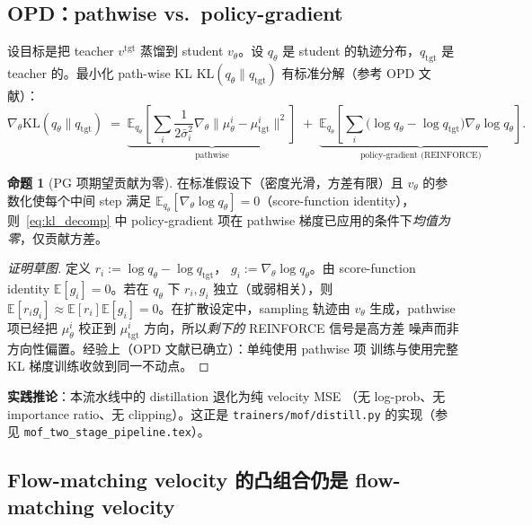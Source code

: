 \documentclass[11pt,a4paper]{article}
\newcommand{\E}{\mathbb{E}}
\newcommand{\KL}{\mathrm{KL}}
\theoremstyle{definition}
\newtheorem{proposition}{命题}
\begin{document}
\subsection{OPD：pathwise vs.\ policy-gradient}
\label{ssec:opd_decomp}

设目标是把 teacher $v^{\mathrm{tgt}}$ 蒸馏到 student $v_\theta$。设
$q_\theta$ 是 student 的轨迹分布，$q_{\mathrm{tgt}}$ 是 teacher 的。最小化
path-wise KL $\KL(q_\theta \| q_{\mathrm{tgt}})$ 有标准分解（参考 OPD
文献）：
\begin{equation}
\nabla_\theta \KL(q_\theta\|q_{\mathrm{tgt}})
\;=\;
\underbrace{\E_{q_\theta}\!\left[\sum_i\frac{1}{2\bar\sigma_i^2}\nabla_\theta\| \mu_\theta^i - \mu_{\mathrm{tgt}}^i \|^2\right]}_{\text{pathwise}}
\;+\;
\underbrace{\E_{q_\theta}\!\left[\sum_i \big(\log q_\theta - \log q_{\mathrm{tgt}}\big)\nabla_\theta\log q_\theta\right]}_{\text{policy-gradient (REINFORCE)}}.
\label{eq:kl_decomp}
\end{equation}

\begin{proposition}[PG 项期望贡献为零]
\label{prop:pg_zero}
在标准假设下（密度光滑，方差有限）且 $v_\theta$ 的参数化使每个中间
step 满足 $\E_{q_\theta}[\nabla_\theta \log q_\theta] = 0$（score-function
identity），则~\eqref{eq:kl_decomp} 中 policy-gradient 项在 pathwise
梯度已应用的条件下\emph{均值为零}，仅贡献方差。
\end{proposition}

\begin{proof}[证明草图]
定义 $r_i := \log q_\theta - \log q_{\mathrm{tgt}}$，
$g_i := \nabla_\theta \log q_\theta$。由 score-function identity
$\E[g_i] = 0$。若在 $q_\theta$ 下 $r_i, g_i$ 独立（或弱相关），则
$\E[r_i g_i] \approx \E[r_i] \E[g_i] = 0$。在扩散设定中，sampling
轨迹由 $v_\theta$ 生成，pathwise 项已经把 $\mu_\theta^i$ 校正到
$\mu_{\mathrm{tgt}}^i$ 方向，所以\emph{剩下的} REINFORCE 信号是高方差
噪声而非方向性偏置。经验上（OPD 文献已确立）：单纯使用 pathwise 项
训练与使用完整 KL 梯度训练收敛到同一不动点。
\end{proof}

\textbf{实践推论}：本流水线中的 distillation 退化为纯 velocity MSE
（无 log-prob、无 importance ratio、无 clipping）。这正是
\texttt{trainers/mof/distill.py} 的实现（参见
\texttt{mof\_two\_stage\_pipeline.tex}）。

\subsection{Flow-matching velocity 的凸组合仍是 flow-matching velocity}
\end{document}

